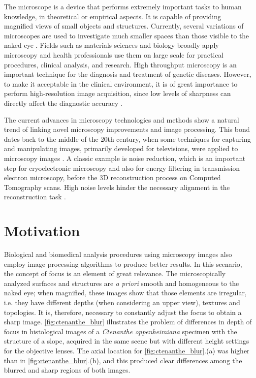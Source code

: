 The microscope is a device that performs extremely important tasks to human knowledge, in theoretical or empirical aspects. It is capable of providing magnified views of small objects and structures. Currently, several variations of microscopes are used to investigate much smaller spaces than those visible to the naked eye \cite{wu2008microscope}. Fields such as materials sciences and biology broadly apply microscopy and health professionals use them on large scale for practical procedures, clinical analysis, and research. High throughput microscopy is an important technique for the diagnosis and treatment of genetic diseases. However, to make it acceptable in the clinical environment, it is of great importance to perform high-resolution image acquisition, since low levels of sharpness can directly affect the diagnostic accuracy \cite{qiu2013evaluations}.

The current advances in microscopy technologies and methods show a natural trend of linking novel microscopy improvements and image processing. This bond dates back to the middle of the 20th century, when some techniques for capturing and manipulating images, primarily developed for televisions, were applied to microscopy images \cite{wu2008microscope}. A classic example is noise reduction, which is an important step for cryoelectronic microscopy and also for energy filtering in transmission electron microscopy, before the 3D reconstruction process on Computed Tomography scans. High noise levels hinder the necessary alignment in the reconstruction task \cite{vyas2017multiscale}.

\section{Motivation}

Biological and biomedical analysis procedures using microscopy images also employ image processing algorithms to produce better results. In this scenario, the concept of focus is an element of great relevance. The microscopically analyzed surfaces and structures are \emph{a priori} smooth and homogeneous to the naked eye; when magnified, these images show that those elements are irregular, i.e. they have different depths (when considering an upper view), textures and topologies. It is, therefore, necessary to constantly adjust the focus to obtain a sharp image. \autoref{fig:ctenanthe_blur} illustrates the problem of differences in depth of focus in histological images of a \emph{Ctenanthe oppenheimiana} specimen with the structure of a slope, acquired in the same scene but with different height settings for the objective lenses. The axial location for \autoref{fig:ctenanthe_blur}.(a) was higher than in \autoref{fig:ctenanthe_blur}.(b), and this produced clear differences among the blurred and sharp regions of both images.

